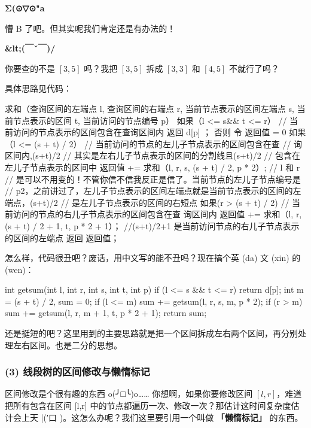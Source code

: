 \textbf{Σ(⊙▽⊙"a}

懵 B 了吧。但其实呢我们肯定还是有办法的！

\textbf{\&lt;(￣ˇ￣)/}

你要查的不是 $[3,5]$ 吗？我把 $[3,5]$ 拆成 $[3,3]$ 和 $[4,5]$ 不就行了吗？

具体思路见代码：

\begin{cppcode}
求和（查询区间的左端点 l, 查询区间的右端点 r, 当前节点表示的区间左端点 s,
    当前节点表示的区间 t, 当前访问的节点编号 p） {
  如果（l <= s&& t <= r）  // 当前访问的节点表示的区间包含在查询区间内
      {返回 d[p] ；} 否则 {
    令 返回值 = 0 如果（l <=
                (s + t) / 2）  // 当前访问的节点的左儿子节点表示的区间包含在查
                               // 询区间内,(s+t)/2
                               // 其实是左右儿子节点表示的区间的分割线且(s+t)/2
                               // 包含在左儿子节点表示的区间中
    {
      返回值 += 求和（l, r, s, (s + t) / 2,
          p * 2）;  // l 和 r
                    // 是可以不用变的！不管你信不信我反正是信了。当前节点的左儿子节点编号是
                    // p2，之前讲过了，左儿子节点表示的区间左端点就是当前节点表示的区间的左端点，(s+t)/2
                    // 是左儿子节点表示的区间的右短点
    }
    如果(r >
         (s + t) / 2)  // 当前访问的节点的右儿子节点表示的区间包含在查 询区间内
    {
        返回值 += 求和（l, r, (s + t) / 2 + 1, t,
        p * 2 + 1）；  //(s+t)/2+1 是当前访问节点的右儿子节点表示的区间的左端点
    } 返回 返回值；
  }
}
\end{cppcode}

怎么样，代码很丑吧？废话，用中文写的能不丑吗？现在搞个英 (da) 文 (xin) 的 (wen)：

\begin{cppcode}
int getsum(int l, int r, int s, int t, int p) {
  if (l <= s && t <= r) return d[p];
  int m = (s + t) / 2, sum = 0;
  if (l <= m) sum += getsum(l, r, s, m, p * 2);
  if (r > m) sum += getsum(l, r, m + 1, t, p * 2 + 1);
  return sum;
}
\end{cppcode}

还是挺短的吧？这里用到的主要思路就是把一个区间拆成左右两个区间，再分别处理左右区间。也是二分的思想。

\subsubsection{(3) 线段树的区间修改与懒惰标记}

区间修改是个很有趣的东西 o(╯□╰)o…… 你想啊，如果你要修改区间 $[l,r]$，难道把所有包含在区间 [l,r] 中的节点都遍历一次、修改一次？那估计这时间复杂度估计会上天 |(′口 )。这怎么办呢？我们这里要引用一个叫做 \textbf{「懒惰标记」} 的东西。

